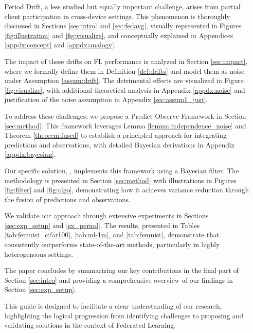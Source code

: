 Period Drift, a less studied but equally important challenge, arises from partial client participation in cross-device settings. This phenomenon is thoroughly discussed in Sections \ref{sec:intro} and \ref{sec:fedavg}, visually represented in Figures \ref{fig:illustration} and \ref{fig:visualize}, and conceptually explained in Appendices \ref{appdx:concept} and \ref{appdx:analogy}.

The impact of these drifts on FL performance is analyzed in Section \ref{sec:impact}, where we formally define them in Definition \ref{def:drifts} and model them as noise under Assumption \ref{assum:drift}. The detrimental effects are visualized in Figure \ref{fig:visualize}, with additional theoretical analysis in Appendix \ref{appdx:noise} and justification of the noise assumption in Appendix \ref{sec:assum1_just}.

To address these challenges, we propose a Predict-Observe Framework in Section \ref{sec:method}. This framework leverages Lemma \ref{lemma:independence_noise} and Theorem \ref{theorem:fused} to establish a principled approach for integrating predictions and observations, with detailed Bayesian derivations in Appendix \ref{appdx:bayesian}.

Our specific solution, \fedeve, implements this framework using a Bayesian filter. The methodology is presented in Section \ref{sec:method} with illustrations in Figures \ref{fig:filter} and \ref{fig:algo}, demonstrating how it achieves variance reduction through the fusion of predictions and observations.

We validate our approach through extensive experiments in Sections \ref{sec:exp_setup} and \ref{ex_period}. The results, presented in Tables \ref{tab:femnist_cifar100}, \ref{tab:ml-1m}, and \ref{tab:femnist}, demonstrate that \fedeve consistently outperforms state-of-the-art methods, particularly in highly heterogeneous settings.

The paper concludes by summarizing our key contributions in the final part of Section \ref{sec:intro} and providing a comprehensive overview of our findings in Section \ref{sec:exp_setup}.

This guide is designed to facilitate a clear understanding of our research, highlighting the logical progression from identifying challenges to proposing and validating solutions in the context of Federated Learning.

\newpage
 
 







    